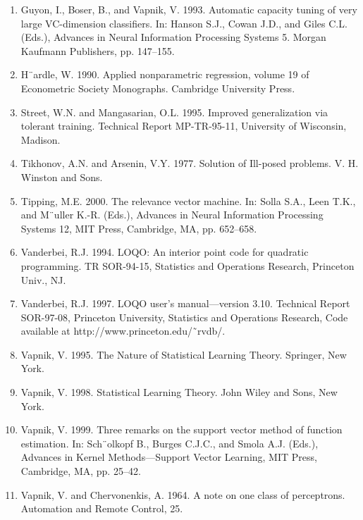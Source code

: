 \documentclass[fleqn,10pt]{olplainarticle}
\begin{document}
\begin{enumerate}
    \item Guyon, I., Boser, B., and Vapnik, V. 1993. Automatic capacity tuning of very large VC-dimension classifiers. In: Hanson S.J., Cowan J.D., and Giles C.L. (Eds.), Advances in Neural Information Processing Systems 5. Morgan Kaufmann Publishers, pp. 147–155.

    \item H¨ardle, W. 1990. Applied nonparametric regression, volume 19 of Econometric Society Monographs. Cambridge University Press.

    \item Street, W.N. and Mangasarian, O.L. 1995. Improved generalization via tolerant training. Technical Report MP-TR-95-11, University of Wisconsin, Madison.

    \item Tikhonov, A.N. and Arsenin, V.Y. 1977. Solution of Ill-posed problems. V. H. Winston and Sons.

    \item Tipping, M.E. 2000. The relevance vector machine. In: Solla S.A., Leen T.K., and M¨uller K.-R. (Eds.), Advances in Neural Information Processing Systems 12, MIT Press, Cambridge, MA, pp. 652–658.

    \item Vanderbei, R.J. 1994. LOQO: An interior point code for quadratic programming. TR SOR-94-15, Statistics and Operations Research, Princeton Univ., NJ.

    \item Vanderbei, R.J. 1997. LOQO user’s manual—version 3.10. Technical Report SOR-97-08, Princeton University, Statistics and Operations Research, Code available at http://www.princeton.edu/˜rvdb/.

    \item Vapnik, V. 1995. The Nature of Statistical Learning Theory. Springer, New York.

    \item Vapnik, V. 1998. Statistical Learning Theory. John Wiley and Sons, New York.

    \item Vapnik, V. 1999. Three remarks on the support vector method of function estimation. In: Sch¨olkopf B., Burges C.J.C., and Smola A.J. (Eds.), Advances in Kernel Methods—Support Vector Learning, MIT Press, Cambridge, MA, pp. 25–42.

    \item Vapnik, V. and Chervonenkis, A. 1964. A note on one class of perceptrons. Automation and Remote Control, 25.


\end{enumerate}
\end{document}
